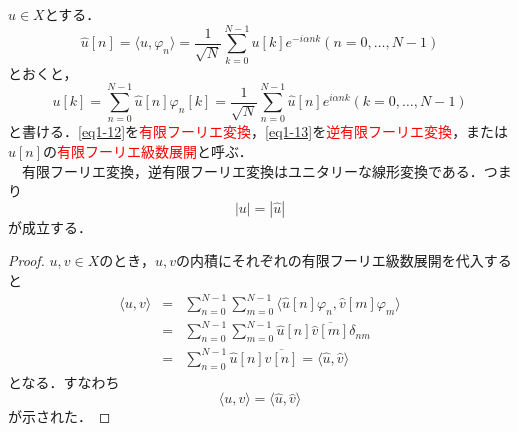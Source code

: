 \documentclass[a4j]{jsbook}
\numberwithin{theorem}{chapter}  %
\begin{document}
\(u\in X\)とする．
\begin{equation}
    \hat{u}[n]=\langle u, \varphi_n\rangle=\frac{1}{\sqrt{N}}\sum_{k=0}^{N-1}u[k]e^{-i\alpha nk} (n=0, \dots, N-1) \label{eq1-12}
\end{equation}
とおくと，
\begin{equation}
    u[k]=\sum_{n=0}^{N-1}\hat{u}[n]\varphi_n[k]=\frac{1}{\sqrt{N}}\sum_{n=0}^{N-1}\hat{u}[n]e^{i\alpha nk} (k=0, \dots, N-1) \label{eq1-13}
\end{equation}
と書ける．\eqref{eq1-12}を\textcolor{red}{有限フーリエ変換}，\eqref{eq1-13}を\textcolor{red}{逆有限フーリエ変換}，または\(\hat{u}[n]\)の\textcolor{red}{有限フーリエ級数展開}と呼ぶ．\\
　有限フーリエ変換，逆有限フーリエ変換はユニタリーな線形変換である．つまり
\begin{equation}
    |u|=|\hat{u}| \label{eq1-14}
\end{equation}
が成立する．
\begin{proof}
\(u, v\in X\)のとき，\(u, v\)の内積にそれぞれの有限フーリエ級数展開を代入すると
\begin{eqnarray*}
\langle u, v\rangle&=&\sum_{n=0}^{N-1}\sum_{m=0}^{N-1}\langle \hat{u}[n]\varphi_n, \hat{v}[m]\varphi_m\rangle \\
&=&\sum_{n=0}^{N-1}\sum_{m=0}^{N-1}\hat{u}[n]\overline{\hat{v}[m]}\delta_{nm} \\
&=&\sum_{n=0}^{N-1}\hat{u}[n]\overline{\hat{v}[n]}=\langle\hat{u}, \hat{v}\rangle
\end{eqnarray*}
となる．すなわち
\begin{equation}
    \langle u, v\rangle=\langle\hat{u}, \hat{v}\rangle \label{eq1-15}
\end{equation}
が示された．
\end{proof}
\end{document}
